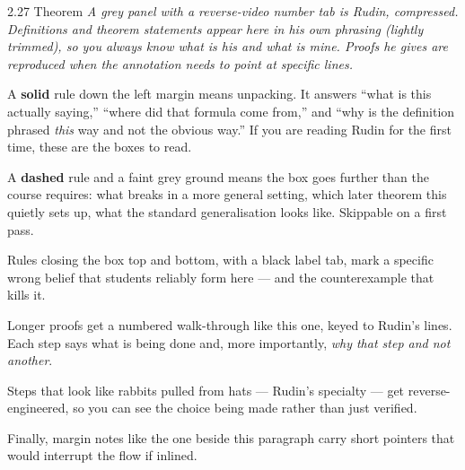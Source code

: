 \documentclass[11pt,twoside]{article}
\begin{document}
\begin{rudinbox}{\textsc{2.27} Theorem}
\itshape A grey panel with a reverse-video number tab is Rudin, compressed.
Definitions and theorem statements appear here in his own phrasing (lightly
trimmed), so you always know what is his and what is mine. Proofs he gives are
reproduced when the annotation needs to point at specific lines.
\end{rudinbox}

\begin{unpack}
A \textbf{solid} rule down the left margin means unpacking. It answers ``what is
this actually saying,'' ``where did that formula come from,'' and ``why is the
definition phrased \emph{this} way and not the obvious way.'' If you are reading
Rudin for the first time, these are the boxes to read.
\end{unpack}

\begin{deeper}
A \textbf{dashed} rule and a faint grey ground means the box goes further than
the course requires: what breaks in a more general setting, which later theorem
this quietly sets up, what the standard generalisation looks like. Skippable on
a first pass.
\end{deeper}

\begin{pitfall}
Rules closing the box top and bottom, with a black label tab, mark a specific
wrong belief that students reliably form here --- and the counterexample that
kills it.
\end{pitfall}

\begin{proofwalk}
  \item Longer proofs get a numbered walk-through like this one, keyed to
        Rudin's lines. Each step says what is being done and, more importantly,
        \emph{why that step and not another}.
  \item Steps that look like rabbits pulled from hats --- Rudin's specialty ---
        get reverse-engineered, so you can see the choice being made rather
        than just verified.
\end{proofwalk}

Finally, margin notes like the one beside this paragraph carry short pointers
that would interrupt the flow if inlined.

\newpage

\end{document}
